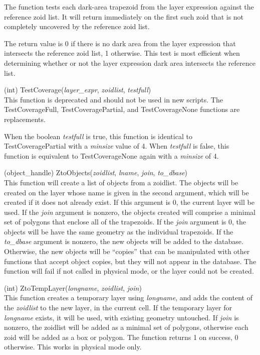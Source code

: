 \begin{description}
The function tests each dark-area trapezoid from the layer expression
against the reference zoid list.  It will return immediately on the
first such zoid that is not completely uncovered by the reference zoid
list.

The return value is 0 if there is no dark area from the layer
expression that intersects the reference zoid list, 1 otherwise. 
This test is most efficient when determining whether or not the layer
expression dark area intersects the reference list.

\item{(int) \vt TestCoverage({\it layer\_expr}, {\it zoidlist},
  {\it testfull\/})}\\
This function is deprecated and should not be used in new scripts. 
The {\vt TestCoverageFull}, {\vt TestCoveragePartial}, and {\vt
TestCoverageNone} functions are replacements.

When the boolean {\it testfull} is true, this function is identical to
{\vt TestCoveragePartial} with a {\it minsize} value of 4.  When {\it
testfull} is false, this function is equivalent to {\vt
TestCoverageNone} again with a {\it minsize} of 4.

\item{(object\_handle) \vt ZtoObjects({\it zoidlist},
  {\it lname}, {\it join}, {\it to\_dbase\/})}\\
This function will create a list of objects from a zoidlist.  The
objects will be created on the layer whose name is given in the second
argument, which will be created if it does not already exist.  If this
argument is 0, the current layer will be used.  If the {\it join}
argument is nonzero, the objects created will comprise a minimal set
of polygons that enclose all of the trapezoids.  If the {\it join}
argument is 0, the objects will be have the same geometry as the
individual trapezoids.  If the {\it to\_dbase} argument is nonzero, the
new objects will be added to the database.  Otherwise, the new objects
will be ``copies'' that can be manipulated with other functions that
accept object copies, but they will not appear in the database.  The
function will fail if not called in physical mode, or the layer could
not be created.

\item{(int) \vt ZtoTempLayer({\it longname}, {\it zoidlist},
  {\it join\/})}\\
This function creates a temporary layer using {\it longname}, and adds
the content of the {\it zoidlist} to the new layer, in the current
cell.  If the temporary layer for {\it longname} exists, it will be
used, with existing geometry untouched.  If {\it join} is nonzero, the
zoidlist will be added as a minimal set of polygons, otherwise each
zoid will be added as a box or polygon.  The function returns 1 on
success, 0 otherwise.  This works in physical mode only.


\end{description}
